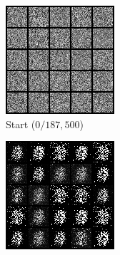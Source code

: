 \documentclass{article}
\begin{document}
\begin{figure}[!htbp]
  \centering
  \begin{subfigure}[b]{0.3\textwidth}
    \includegraphics[width=\textwidth]{img/p2t2/0.png}
    \caption{Start ($0/187,500$)}
  \end{subfigure}
  \begin{subfigure}[b]{0.3\textwidth}
    \includegraphics[width=\textwidth]{img/p2t2/1000.png}

\end{subfigure}
\end{figure}
\end{document}
